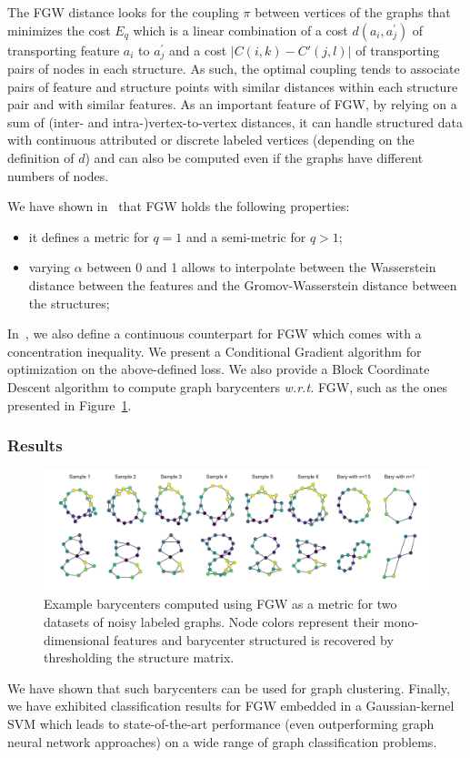The FGW distance looks for the coupling $\pi$ between vertices of the
graphs that minimizes the cost $E_{q}$ which is a linear combination of a cost
$d(a_{i},a^\prime_j)$ of transporting feature $a_{i}$ to $a^\prime_j$
and a cost $|C(i,k)-C'(j,l)|$ of transporting pairs of nodes in each structure.
As such, the optimal coupling tends to associate pairs of feature and
structure points with similar distances within each structure pair and with
similar features.
As an important feature of FGW, by relying on a sum of
(inter- and intra-)vertex-to-vertex distances, it can handle structured data
with continuous attributed or discrete labeled vertices
(depending on the definition of $d$) and can also be computed even if the graphs
have different numbers of nodes.

We have shown in~\cite{vayer:hal-02174322} that FGW holds the following
properties:

\begin{itemize}
\item it defines a metric for $q=1$ and a semi-metric for $q >1$;
\item varying $\alpha$ between 0 and 1 allows to interpolate between the
Wasserstein distance between the features and the Gromov-Wasserstein distance
between the structures;
\end{itemize}

In~\cite{vayer:hal-02174316},
we also define a continuous counterpart for FGW which comes with a
concentration inequality.
We present a Conditional Gradient algorithm for optimization on the
above-defined loss.
We also provide a Block Coordinate Descent algorithm to compute graph
barycenters \emph{w.r.t.} FGW, such as the ones presented in
Figure~\ref{fig:bary_fgw}.

\subsubsection{Results}

\begin{figure}
\centering
\includegraphics[width=\textwidth]{fig/fgw_bary}
\caption{Example barycenters computed using FGW as a metric for two datasets of
noisy labeled graphs. Node colors represent their mono-dimensional features and
barycenter structured is recovered by thresholding the structure matrix.
\label{fig:bary_fgw}}
\end{figure}

We have shown that such barycenters can be used for graph clustering.
Finally, we have exhibited classification results for FGW embedded in a
Gaussian-kernel SVM which leads to state-of-the-art performance
(even outperforming graph
neural network approaches) on a wide range of graph classification problems.
